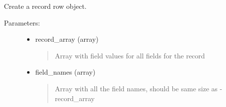 \documentclass[letterpaper,10pt,english]{sphinxmanual}
\begin{document}
\begin{fulllineitems}

\begin{fulllineitems}
Create a record row object.
\begin{description}
\item[{Parameters:}] \leavevmode\begin{itemize}
\item {} 
record\_array (array)
\begin{quote}

Array with field values for all fields for the record
\end{quote}

\item {} 
field\_names (array)
\begin{quote}

Array with all the field names, should be same size as -record\_array
\end{quote}

\end{itemize}

\end{description}

\end{fulllineitems}


\begin{fulllineitems}
\label{knop_database:knop_databaserow.record_array}
\end{fulllineitems}



\begin{fulllineitems}
\end{fulllineitems}


\begin{fulllineitems}
\label{knop_database:knop_databaserow.version}
\end{fulllineitems}



\begin{fulllineitems}
\end{fulllineitems}


\end{fulllineitems}
\end{document}
